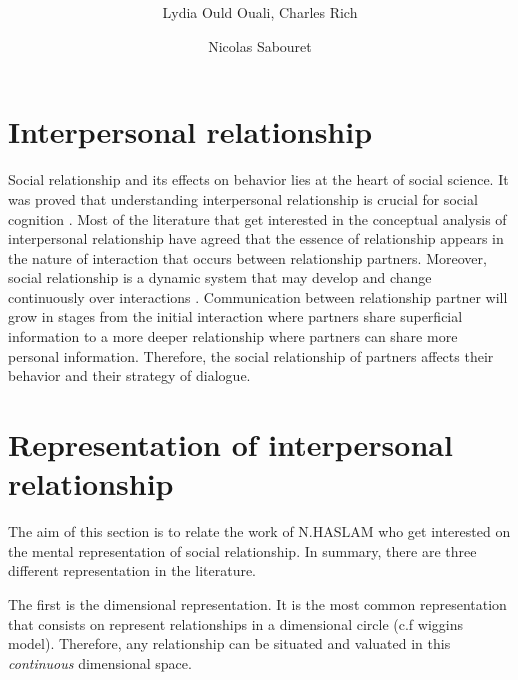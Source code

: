 \documentclass{llncs}
\begin{document}
\title{  \vskip -10pt}

\author{Lydia Ould Ouali, Charles Rich \and
Nicolas Sabouret }

\maketitle 

\section{Interpersonal relationship}
Social relationship and its effects on behavior lies at the heart of social science. It was proved that understanding interpersonal relationship is crucial for social cognition \cite{reis2000relationship}. Most of the literature that get interested in the conceptual analysis of interpersonal relationship have agreed that the essence of relationship appears in the nature of interaction that occurs between relationship partners. Moreover, social relationship is a dynamic system that may develop and change continuously over interactions \cite{reis2000relationship,svennevig2000getting}.
Communication between relationship partner will grow in stages from the initial interaction where partners share superficial information to a more deeper relationship where partners can share more personal information. Therefore, the social relationship of partners affects their behavior and their strategy of dialogue.

\section{Representation of interpersonal relationship}

The aim of this section is to relate the work of N.HASLAM \cite{haslam1994mental} who get interested on the mental representation of social relationship. In summary, there are three different representation in the literature. 
\par The first is the dimensional representation. It is the most common representation that consists on represent relationships in a dimensional circle (c.f wiggins model). Therefore, any relationship can be situated and valuated  in this  \textit{continuous} dimensional space. 
\end{document}
